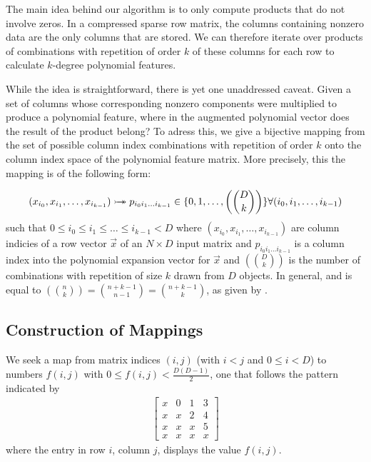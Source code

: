 \documentclass{article} %
\begin{document}
The main idea behind our algorithm is to only compute products that do not involve zeros.
In a compressed sparse row matrix, the columns containing nonzero data are the only columns that are stored.
We can therefore iterate over products of combinations with repetition of order $k$ of these columns for each row to calculate $k$-degree polynomial features.

While the idea is straightforward, there is yet one unaddressed caveat.
Given a set of columns whose corresponding nonzero components were multiplied to produce a polynomial feature, where in the augmented polynomial vector does the result of the product belong?
To adress this, we give a bijective mapping from the set of possible column index combinations with repetition of order $k$ onto the column index space of the polynomial feature matrix.
More precisely, this the mapping is of the following form:

\begin{equation}
(x_{i_0}, x_{i_1}, \dots, x_{i_{k-1}}) \rightarrowtail \hspace{-1.9ex} \twoheadrightarrow p_{i_0i_1 \dots i_{k-1}} \in \{0,1,\dots, \left(\binom{D}{k}\right)\} 
\forall (i_0, i_1, \dots, i_{k-1})
\end{equation}
such that $ 0 \le i_0 \le i_1 \le \dots \le i_{k-1} < D$
where $(x_{i_0}, x_{i_1}, \dots, x_{i_{k-1}})$ are column indicies of a row vector $\vec{x}$ of an $N \times D$ input matrix and $p_{i_0i_1 \dots i_{k-1}}$ is a column index into the polynomial expansion vector for $\vec{x}$
and $\left(\binom{D}{k}\right)$ is the number of combinations with repetition of size $k$ drawn from $D$ objects.
In general, and is equal to $\left(\binom{n}{k}\right) = \binom{n+k-1}{n-1} = \binom{n+k-1}{k}$, as given by \cite{stanley1986enumerative}.

\subsection{Construction of Mappings}

We seek a map from matrix indices $(i, j)$ (with $i < j$ and $0 \le i < D$) to numbers $f(i, j)$ with $0 \le f(i, j) < \frac{D(D-1)}{2}$, one that follows the pattern indicated by 
\begin{align}
\begin{bmatrix}
x & 0 & 1 & 3 \\
x & x & 2 & 4 \\
x & x & x & 5 \\
x & x & x & x
\end{bmatrix}
\label{eq:4x4mat}
\end{align}
where the entry in row $i$, column $j$, displays the value $f(i, j)$. 
\end{document}
